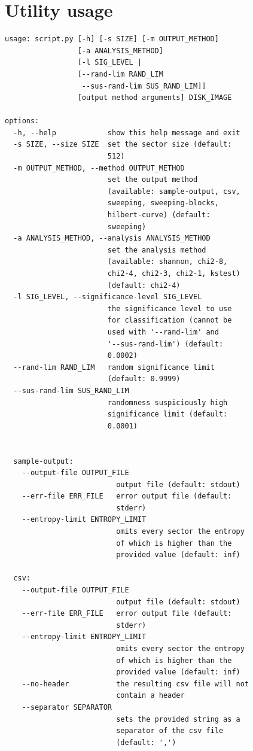 \documentclass[
  digital, %
  color,   %
  oneside, %
  lof,     %
  nolot,     %
]{fithesis4}
\begin{document}
\makeatletter\thesis@blocks@clear\makeatother
\sloppy
\printbibliography

\appendix %
\chapter{Utility usage}
\label{chap:utility-usage}

\begin{verbatim}
usage: script.py [-h] [-s SIZE] [-m OUTPUT_METHOD] 
                 [-a ANALYSIS_METHOD] 
                 [-l SIG_LEVEL | 
                 [--rand-lim RAND_LIM 
                  --sus-rand-lim SUS_RAND_LIM]]
                 [output method arguments] DISK_IMAGE

options:
  -h, --help            show this help message and exit
  -s SIZE, --size SIZE  set the sector size (default:
                        512)
  -m OUTPUT_METHOD, --method OUTPUT_METHOD
                        set the output method
                        (available: sample-output, csv,
                        sweeping, sweeping-blocks,
                        hilbert-curve) (default:
                        sweeping)
  -a ANALYSIS_METHOD, --analysis ANALYSIS_METHOD
                        set the analysis method
                        (available: shannon, chi2-8,
                        chi2-4, chi2-3, chi2-1, kstest)
                        (default: chi2-4)
  -l SIG_LEVEL, --significance-level SIG_LEVEL
                        the significance level to use
                        for classification (cannot be
                        used with '--rand-lim' and
                        '--sus-rand-lim') (default:
                        0.0002)
  --rand-lim RAND_LIM   random significance limit
                        (default: 0.9999)
  --sus-rand-lim SUS_RAND_LIM
                        randomness suspiciously high
                        significance limit (default:
                        0.0001)


  sample-output:
    --output-file OUTPUT_FILE
                          output file (default: stdout)
    --err-file ERR_FILE   error output file (default:
                          stderr)
    --entropy-limit ENTROPY_LIMIT
                          omits every sector the entropy
                          of which is higher than the
                          provided value (default: inf)

  csv:
    --output-file OUTPUT_FILE
                          output file (default: stdout)
    --err-file ERR_FILE   error output file (default:
                          stderr)
    --entropy-limit ENTROPY_LIMIT
                          omits every sector the entropy
                          of which is higher than the
                          provided value (default: inf)
    --no-header           the resulting csv file will not
                          contain a header
    --separator SEPARATOR
                          sets the provided string as a
                          separator of the csv file
                          (default: ',')


\end{verbatim}
\end{document}
